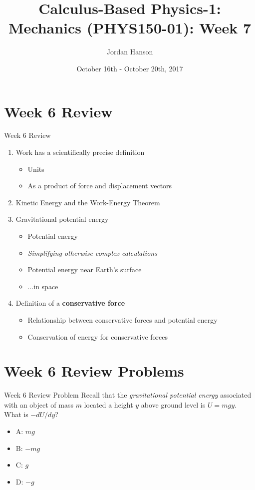 \documentclass{beamer}
\title{Calculus-Based Physics-1: Mechanics (PHYS150-01): Week 7}
\date{October 16th - October 20th, 2017}
\author{Jordan Hanson}
\institute{Whittier College Department of Physics and Astronomy}
\begin{document}
\maketitle

\section{Week 6 Review}

\begin{frame}{Week 6 Review}
\begin{enumerate}
\item \alert{Work} has a scientifically precise definition
\begin{itemize}
\item Units
\item As a product of force and displacement vectors
\end{itemize}
\item Kinetic Energy and the \alert{Work-Energy Theorem}
\item Gravitational potential energy
\begin{itemize}
\item Potential energy
\item \textit{Simplifying otherwise complex calculations}
\item Potential energy near Earth's surface
\item ...in space
\end{itemize}
\item Definition of a \textbf{conservative force}
\begin{itemize}
\item Relationship between conservative forces and potential energy
\item Conservation of energy for conservative forces
\end{itemize}
\end{enumerate}
\end{frame}

\section{Week 6 Review Problems}

\begin{frame}{Week 6 Review Problem}
Recall that the \textit{gravitational potential energy} associated with an object of mass $m$ located a height $y$ above ground level is $U = mgy$.  What is $-dU/dy$?
\begin{itemize}
\item A: $mg$
\item B: $-mg$
\item C: $g$
\item D: $-g$
\end{itemize}
\end{frame}
\end{document}
